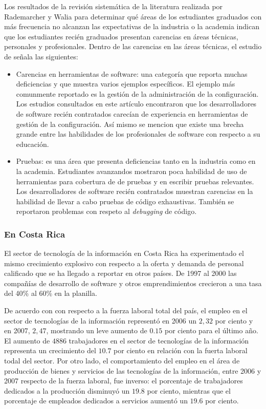 \documentclass[journal]{IEEEtran}
\begin{document}
Los resultados de la revisión sistemática de la literatura realizada por Rademarcher y Walia \cite{radermacher-walia} para determinar qué áreas de los estudiantes graduados con más frecuencia no alcanzan las expectativas de la industria o la academia indican que los estudiantes recién graduados presentan carencias en áreas técnicas, personales y profesionales. Dentro de las carencias en las áreas técnicas, el estudio de \cite{radermacher-walia} señala las siguientes:
\begin{itemize}
    \item Carencias en herramientas de software: una categoría que reporta muchas deficiencias y que muestra varios ejemplos específicos. El ejemplo más comunmente reportado es la gestión de la administración de la configuración. Los estudios consultados en este artículo encontraron que los desarrolladores de software recién contratados carecían de experiencia en herramientas de gestión de la configuración. Así mismo se mencion que existe una brecha grande entre las habilidades de los profesionales de software con respecto a su educación.
    \item Pruebas: es una área que presenta deficiencias tanto en la industria como en la academia. Estudiantes avanzandos mostraron poca habilidad de uso de herramientas para cobertura de de pruebas y en escribir pruebas relevantes. Los desarrolladores de software recién contratados muestran carencias en la habilidad de llevar a cabo pruebas de código exhaustivas. También se reportaron problemas con respeto al \emph{debugging} de código.
\end{itemize}


\subsubsection{En Costa Rica}
El sector de tecnología de la información en Costa Rica ha experimentado el mismo crecimiento explosivo con respecto a la oferta y demanda de personal calificado que se ha llegado a reportar en otros países. De 1997 al 2000 las compañías de desarrollo de software y otros emprendimientos crecieron a una tasa del 40\% al 60\% en la planilla\cite{cenfotec-2}.

De acuerdo con \cite{prosic} con respecto a la fuerza laboral total del país, el empleo en el sector de tecnologías de la información representó en 2006 un $2,32$ por ciento y en 2007, $2,47$, mostrando un leve aumento de $0.15$ por ciento para el último año. El aumento de $4886$ trabajadores en el sector de tecnologías de la información representa un crecimiento del $10.7$ por ciento en relación con la fuerta laboral todal del sector. Por otro lado, el comportamiento del empleo en el área de producción de bienes y servicios de las tecnologías de la información, entre 2006 y 2007 respecto de la fuerza laboral, fue inverso: el porcentaje de trabajadores dedicados a la producción disminuyó un $19.8$ por ciento, mientras que el porcentaje de empleados dedicados a servicios aumentó un $19.6$ por ciento.
\end{document}
